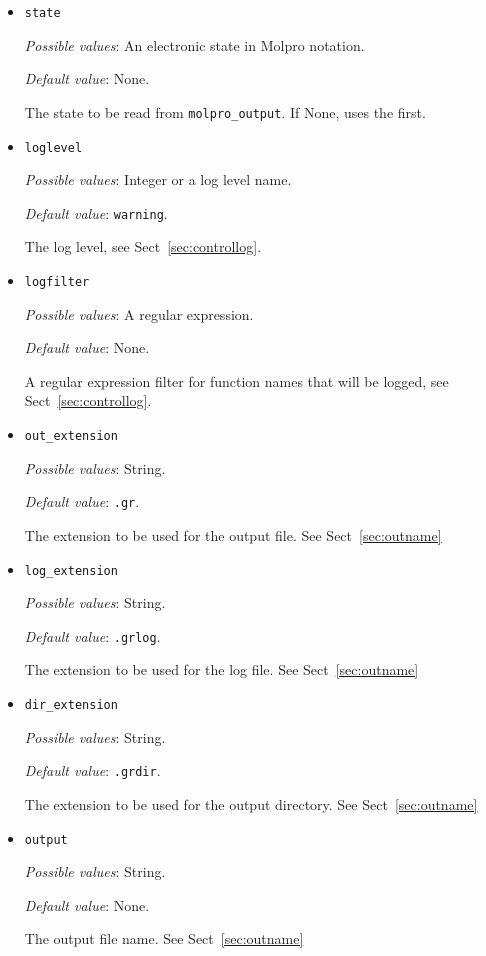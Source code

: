 \begin{itemize}
\item \verb+state+

  \emph{Possible values}: An electronic state in Molpro notation.

  \emph{Default value}: None.

  The state to be read from \verb+molpro_output+. If None, uses the first.

\item \verb+loglevel+

  \emph{Possible values}: Integer or a log level name.

  \emph{Default value}: \verb+warning+.
  
  The log level, see Sect~\ref{sec:controllog}.
  
\item \verb+logfilter+

  \emph{Possible values}: A regular expression.

  \emph{Default value}: None.
  
  A regular expression filter for function names that will be logged,
  see Sect~\ref{sec:controllog}.
  
\item \verb+out_extension+

  \emph{Possible values}: String.

  \emph{Default value}: \verb+.gr+.
  
  The extension to be used for the output file. See Sect~\ref{sec:outname}
  
\item \verb+log_extension+

  \emph{Possible values}: String.

  \emph{Default value}: \verb+.grlog+.
  
  The extension to be used for the log file. See Sect~\ref{sec:outname}
  
\item \verb+dir_extension+

  \emph{Possible values}: String.

  \emph{Default value}: \verb+.grdir+.
  
  The extension to be used for the output directory. See Sect~\ref{sec:outname}

\item \verb+output+

  \emph{Possible values}: String.

  \emph{Default value}: None.

  The output file name. See Sect~\ref{sec:outname}

  
\end{itemize}

